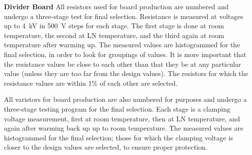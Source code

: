 {\bf {} Divider Board}
All resistors used for board production are numbered and undergo a three-stage  test for final selection. Resistance is measured at voltages up to \SI{4}{kV} in \SI{500}{V} steps for each stage. The first stage is done at  room temperature, the second at LN temperature, and the third again at room temperature after warming up.  The measured values are histogrammed for the final selection, in order to look for groupings of values.   
It is more important that the resistance values be close to each other than that they be at any particular value (unless they are too far from the design values). The resistors for which the resistance values are within 1\% of each other are selected.  

All varistors for board production are also numbered for  purposes and undergo a three-stage  testing program for the final selection. Each stage is a clamping voltage measurement, first at room temperature, then at LN temperature, and again after warming back up up to room temperature.  
The measured values are histogrammed for the final selection; those for which the clamping voltage is closer to the design values are selected, to ensure proper protection.   

